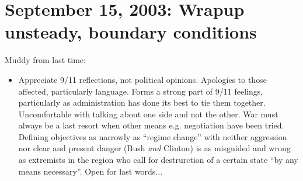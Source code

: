 \documentclass{report}
\begin{document}
\section{September 15, 2003: Wrapup unsteady, boundary conditions}
\label{unstdiff}

Muddy from last time:
\begin{itemize}
\item Appreciate 9/11 reflections, not political opinions.  Apologies to those
  affected, particularly language.  Forms a strong part of 9/11 feelings,
  particularly as administration has done its best to tie them together.
  Uncomfortable with talking about one side and not the other.  War must always
  be a last resort when other means e.g. negotiation have been tried.  Defining
  objectives as narrowly as ``regime change'' with neither aggression nor clear
  and present danger (Bush {\em and} Clinton) is as misguided and wrong as
  extremists in the region who call for destrurction of a certain state ``by
  any means necessary''.  Open for last words...
\end{itemize}
\end{document}
